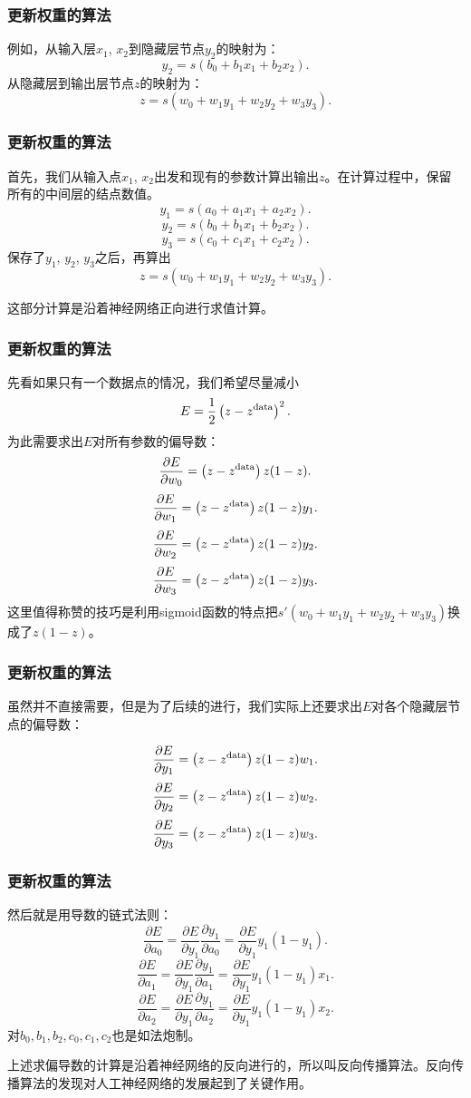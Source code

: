 \documentclass[CJK]{beamer}
\begin{document}
  \begin{frame}
    \frametitle{更新权重的算法}

    例如，从输入层$x_1$, $x_2$到隐藏层节点$y_2$的映射为：
    $$y_2 = s(b_0+b_1x_1+b_2x_2).$$
    从隐藏层到输出层节点$z$的映射为：
    $$z = s(w_0+w_1y_1+w_2y_2+w_3y_3).$$
  \end{frame}


  \begin{frame}
    \frametitle{更新权重的算法}
    首先，我们从输入点$x_1$, $x_2$出发和现有的参数计算出输出$z$。在计算过程中，保留所有的中间层的结点数值。
    $$y_1 = s(a_0+a_1x_1+a_2x_2).$$
    $$y_2 = s(b_0+b_1x_1+b_2x_2).$$
    $$y_3 = s(c_0+c_1x_1+c_2x_2).$$    
    保存了$y_1$, $y_2$, $y_3$之后，再算出 
    $$z = s(w_0+w_1y_1+w_2y_2+w_3y_3).$$

    这部分计算是沿着神经网络正向进行求值计算。
  \end{frame}
  

  \begin{frame}
    \frametitle{更新权重的算法}
    先看如果只有一个数据点的情况，我们希望尽量减小
    $$ E =\frac{1}{2} \left(z-z^{\rm data}\right)^2.$$
    为此需要求出$E$对所有参数的偏导数：
    $$\frac{\partial E}{\partial w_0} =  \left(z-z^{\rm data}\right)z(1-z). $$
    $$\frac{\partial E}{\partial w_1} =  \left(z-z^{\rm data}\right)z(1-z)y_1. $$
    $$\frac{\partial E}{\partial w_2} =  \left(z-z^{\rm data}\right)z(1-z)y_2.$$
    $$\frac{\partial E}{\partial w_3} =  \left(z-z^{\rm data}\right)z(1-z)y_3.$$
    这里值得称赞的技巧是利用sigmoid函数的特点把$s'(w_0+w_1y_1+w_2y_2+w_3y_3)$换成了$z(1-z)$。
  \end{frame}
  

  \begin{frame}
    \frametitle{更新权重的算法}
    虽然并不直接需要，但是为了后续的进行，我们实际上还要求出$E$对各个隐藏层节点的偏导数：


    $$\frac{\partial E}{\partial y_1} =  \left(z-z^{\rm data}\right)z(1-z)w_1. $$
    $$\frac{\partial E}{\partial y_2} =  \left(z-z^{\rm data}\right)z(1-z)w_2.$$
    $$\frac{\partial E}{\partial y_3} =  \left(z-z^{\rm data}\right)z(1-z)w_3.$$
  \end{frame}

  \begin{frame}
    \frametitle{更新权重的算法}
    然后就是用导数的链式法则：
    $$\frac{\partial E}{\partial a_0} = \frac{\partial E}{\partial y_1}\frac{\partial y_1}{\partial a_0} =  \frac{\partial E}{\partial y_1}y_1(1-y_1).$$
    $$\frac{\partial E}{\partial a_1} = \frac{\partial E}{\partial y_1}\frac{\partial y_1}{\partial a_1} =  \frac{\partial E}{\partial y_1}y_1(1-y_1)x_1.$$
    $$\frac{\partial E}{\partial a_2} = \frac{\partial E}{\partial y_1}\frac{\partial y_1}{\partial a_2} =  \frac{\partial E}{\partial y_1}y_1(1-y_1)x_2.$$         对$b_0, b_1, b_2, c_0, c_1,c_2$也是如法炮制。

    上述求偏导数的计算是沿着神经网络的反向进行的，所以叫{\blue 反向传播算法}。反向传播算法的发现对人工神经网络的发展起到了关键作用。
  \end{frame}
\end{document}
